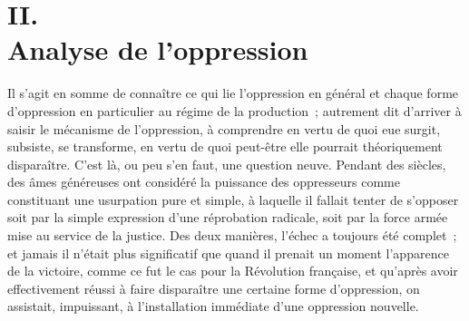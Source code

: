 \documentclass[french,twoside]{book} %
\begin{document}
\begin{center}
\end{center}
\section[II. Analyse de l’oppression]{II. \\
Analyse de l’oppression}\renewcommand{\leftmark}{II. \\
Analyse de l’oppression}

\noindent \par
Il s'agit en somme de connaître ce qui lie l'oppression en général et chaque forme d'oppression en particulier au régime de la production ; autrement dit d'arriver à saisir le mécanisme de l'oppression, à comprendre en vertu de quoi eue surgit, subsiste, se transforme, en vertu de quoi peut-être elle pourrait théoriquement disparaître. C'est là, ou peu s'en faut, une question neuve. Pendant des siècles, des âmes généreuses ont considéré la puissance des oppresseurs comme constituant une usurpation pure et simple, à laquelle il fallait tenter de s'opposer soit par la simple expression d'une réprobation radicale, soit par la force armée mise au service de la justice. Des deux manières, l'échec a toujours été complet ; et jamais il n'était plus significatif que quand il prenait un moment l'apparence de la victoire, comme ce fut le cas pour la Révolution française, et qu'après avoir effectivement réussi à faire disparaître une certaine forme d'oppression, on assistait, impuissant, à l'installation immédiate d'une oppression nouvelle.\par
\end{document}
